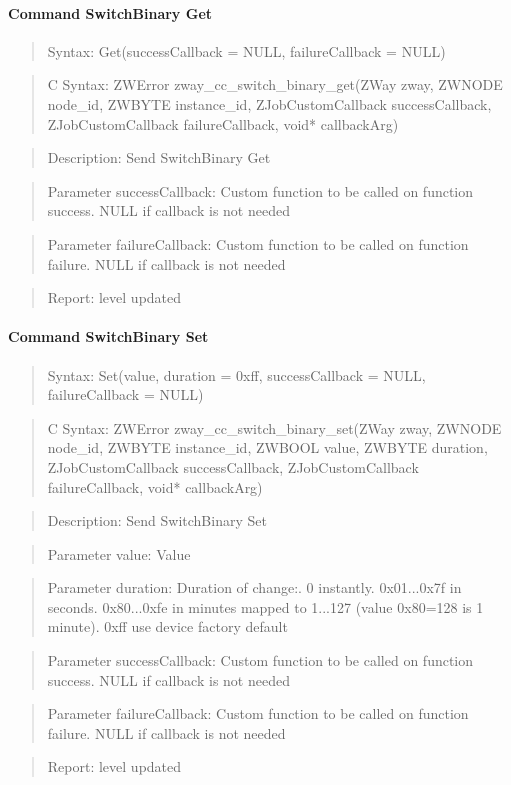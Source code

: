 \paragraph{Command SwitchBinary Get}
\begin{quote}Syntax: Get(successCallback = NULL, failureCallback = NULL)\end{quote}
\begin{quote}C Syntax: ZWError zway\_cc\_switch\_binary\_get(ZWay zway, ZWNODE node\_id, ZWBYTE instance\_id, ZJobCustomCallback successCallback, ZJobCustomCallback failureCallback, void* callbackArg)\end{quote}
\begin{quote}Description: Send SwitchBinary Get\end{quote}
\begin{quote}Parameter successCallback: Custom function to be called on function success. NULL if callback is not needed\end{quote}
\begin{quote}Parameter failureCallback: Custom function to be called on function failure. NULL if callback is not needed\end{quote}
\begin{quote}Report: level updated\end{quote}

\paragraph{Command SwitchBinary Set}
\begin{quote}Syntax: Set(value, duration = 0xff, successCallback = NULL, failureCallback = NULL)\end{quote}
\begin{quote}C Syntax: ZWError zway\_cc\_switch\_binary\_set(ZWay zway, ZWNODE node\_id, ZWBYTE instance\_id, ZWBOOL value, ZWBYTE duration, ZJobCustomCallback successCallback, ZJobCustomCallback failureCallback, void* callbackArg)\end{quote}
\begin{quote}Description: Send SwitchBinary Set\end{quote}
\begin{quote}Parameter value: Value\end{quote}
\begin{quote}Parameter duration: Duration of change:. 0 instantly. 0x01...0x7f in seconds. 0x80...0xfe in minutes mapped to 1...127 (value 0x80=128 is 1 minute). 0xff use device factory default\end{quote}
\begin{quote}Parameter successCallback: Custom function to be called on function success. NULL if callback is not needed\end{quote}
\begin{quote}Parameter failureCallback: Custom function to be called on function failure. NULL if callback is not needed\end{quote}
\begin{quote}Report: level updated\end{quote}


